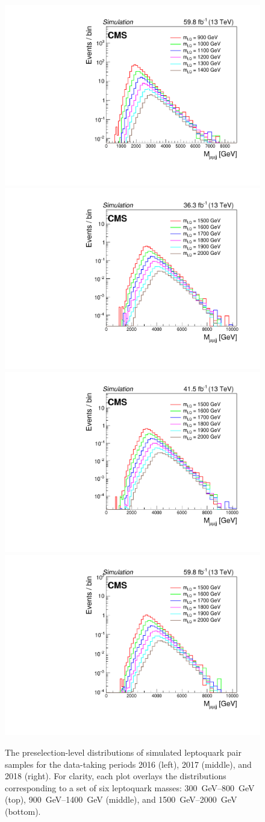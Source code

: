 \begin{figure}[H]
    {\includegraphics[width=.32\textwidth]{Images/Analysis/SignalMassStudy/2018/Mujbj_M900_to_M1400.pdf}}
    {\includegraphics[width=.32\textwidth]{Images/Analysis/SignalMassStudy/2016/Mujbj_M1500_to_M2000.pdf}}
    {\includegraphics[width=.32\textwidth]{Images/Analysis/SignalMassStudy/2017/Mujbj_M1500_to_M2000.pdf}}
    {\includegraphics[width=.32\textwidth]{Images/Analysis/SignalMassStudy/2018/Mujbj_M1500_to_M2000.pdf}}
    \caption{The preselection-level \Muujj distributions of simulated leptoquark pair samples for the data-taking periods 2016 (left), 2017 (middle), and 2018 (right). For clarity, each plot overlays the distributions corresponding to a set of six leptoquark masses: \SIrange{300}{800}{GeV} (top), \SIrange{900}{1400}{GeV} (middle), and \SIrange{1500}{2000}{GeV} (bottom).}
    \label{figapp:lqsim1}
\end{figure}

